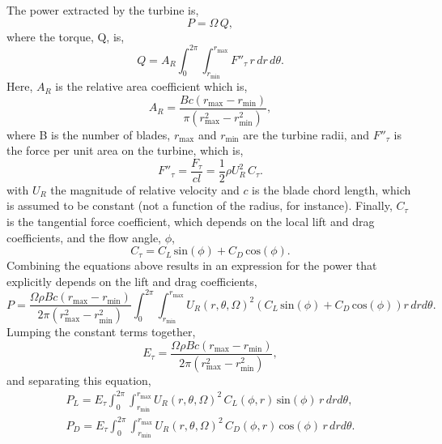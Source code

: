 The power extracted by the turbine is, 
\begin{equation}
 P = \Omega \, Q,
\end{equation}
where the torque, Q, is\cite{morgado2014validation}, 
\begin{equation}
 Q = A_R \int_0^{2\pi} \int_{r_{\text{min}}}^{r_{\text{max}}}
  F''_{\tau}\, r\, dr \, d\theta.
\end{equation}
Here, $A_R$ is the relative area coefficient which is, 
\begin{equation}
A_R = \frac{B c (r_{\text{max}}-r_{\text{min}})}{\pi(r_{\text{max}}^2-r_{\text{min}}^2)},
\end{equation}
where B is the number of blades, $r_{\text{max}}$ and $r_{\text{min}}$
are the turbine radii, and $F''_{\tau}$ is the force per unit
area on the turbine, which is, 
\begin{equation}
 F''_{\tau} = \frac{F_{\tau}}{cl}= \frac{1}{2}\rho U_R^2 \, C_{\tau}.
\end{equation}
with $U_R$ the magnitude of relative velocity and $c$ is the blade chord
length, which is assumed to be constant (not a function of the radius,
for instance). Finally, $C_{\tau}$ is the tangential force coefficient,
which depends on the local lift and drag coefficients, and the
flow angle, $\phi$, 
\begin{equation}
 C_{\tau} = C_L \,\text{sin}(\phi) + C_D \,\text{cos}(\phi).
\end{equation}
Combining the equations above results in an expression for the power
that explicitly depends on the lift and drag coefficients, 
\begin{equation*}
 P = \frac{\Omega \rho B c (r_{\text{max}}-r_{\text{min}})}{2 \pi(r_{\text{max}}^2-r_{\text{min}}^2)}
\int_0^{2\pi}
\int_{r_{\text{min}}}^{r_{\text{max}}} U_R(r,\theta,\Omega)^2 \left(C_L
						     \,\text{sin}(\phi)
						     + C_D
						     \,\text{cos}(\phi)
						    \right) r\,dr d\theta. 
\end{equation*}
Lumping the constant terms together, 
\begin{equation}
E_{\tau} = \frac{\Omega \rho B c (r_{\text{max}}-r_{\text{min}})}{2
 \pi(r_{\text{max}}^2-r_{\text{min}}^2)},
\end{equation}
 and separating this equation, 
\begin{align}
 P_L = E_\tau
 \int_0^{2\pi}
  \int_{r_{\text{min}}}^{r_{\text{max}}} U_R(r,\theta,\Omega)^2 \, C_L(\phi,r)
 \,\text{sin}(\phi)\, r\,dr d\theta,  \label{lift} \\
 P_D = E_\tau
 \int_0^{2\pi}
  \int_{r_{\text{min}}}^{r_{\text{max}}} U_R(r,\theta,\Omega)^2 \, C_D(\phi,r) \,\text{cos}(\phi)\, r\,dr d\theta. \label{drag}
\end{align}
